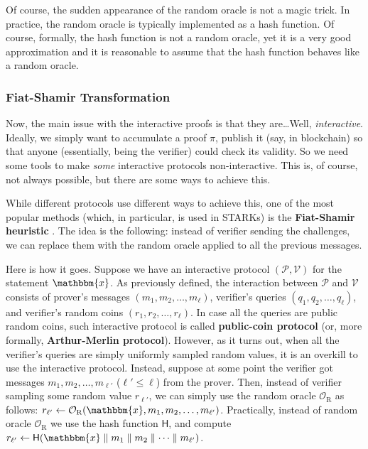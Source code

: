 \documentclass[../../book.tex]{subfiles}
\begin{document}
\begin{remark}
    Of course, the sudden appearance of the random oracle is not a magic trick.
    In practice, the random oracle is typically implemented as a hash function.
    Of course, formally, the hash function is not a random oracle, yet it is a
    very good approximation and it is reasonable to assume that the hash
    function behaves like a random oracle.
\end{remark}

\subsubsection{Fiat-Shamir Transformation}\label{subsection:fiat-shamir}

Now, the main issue with the interactive proofs is that they are\ldots Well,
\textit{interactive}. Ideally, we simply want to accumulate a proof $\pi$,
publish it (say, in blockchain) so that anyone (essentially, being the verifier)
could check its validity. So we need some tools to make \textit{some}
interactive protocols non-interactive. This is, of course, not always possible,
but there are some ways to achieve this.

While different protocols use different ways to achieve this, one of the most
popular methods (which, in particular, is used in STARKs) is the
\textbf{Fiat-Shamir heuristic} \cite{fiat1986}. The idea is the following: instead of verifier
sending the challenges, we can replace them with the random oracle applied to
all the previous messages.

Here is how it goes. Suppose we have an interactive protocol $(\mathcal{P},
\mathcal{V})$ for the statement $\mathbbm{x}$. As previously defined, the
interaction between $\mathcal{P}$ and $\mathcal{V}$ consists of prover's
messages $(m_1,m_2,\dots,m_{\ell})$, verifier's queries
$(q_1,q_2,\dots,q_{\ell})$, and verifier's random coins
$(r_1,r_2,\dots,r_{\ell})$. In case all the queries are public random coins,
such interactive protocol is called \textbf{public-coin protocol} (or, more
formally, \textbf{Arthur-Merlin protocol}). However, as it turns out, when all
the verifier's queries are simply uniformly sampled random values, it is an
overkill to use the interactive protocol. Instead, suppose at some point the
verifier got messages $m_1,m_2,\dots,m_{\ell'}$ ($\ell' \leq \ell$) from the
prover. Then, instead of verifier sampling some random value $r_{\ell'}$, we can
simply use the random oracle $\mathcal{O}_{\text{R}}$ as follows: $r_{\ell'}
\gets \mathcal{O}_{\text{R}}(\mathbbm{x},m_1,m_2,\dots,m_{\ell'})$. Practically,
instead of random oracle $\mathcal{O}_{\text{R}}$ we use the hash function $\mathsf{H}$,
and compute $r_{\ell'} \gets \mathsf{H}(\mathbbm{x} \parallel m_1 \parallel m_2 \parallel \dots
\parallel m_{\ell'})$.
\end{document}
